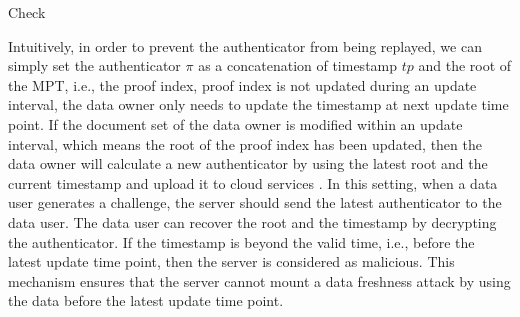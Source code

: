 \begin{algorithm}[t]
  \caption{Check}
  \label{alg:check}
  \begin{algorithmic}[1]
              \ENDIF
                      \BREAK
                    \ENDIF
                \ENDFOR
                \ELSE
                \ENDIF
              \ELSE
              \ENDIF
  \end{algorithmic}
\end{algorithm}

Intuitively, in order to prevent the authenticator from being replayed, we can simply set the authenticator $\pi$ as a concatenation of timestamp $tp$ and the root of the MPT, i.e., the proof index,   proof index is not updated during an update interval, the data owner only needs to update the timestamp at next update time point. If the document set of the data owner is modified within an update interval, which means the root of the proof index has been updated, then the data owner will calculate a new authenticator by using the latest root and the current timestamp and upload it to cloud services . %
In this setting, when a data user generates a challenge, the server should send the latest authenticator to the data user. The data user can recover the root and the timestamp by decrypting the authenticator. If the timestamp is beyond the valid time, i.e., before the latest update time point, then the server is considered as malicious. This mechanism ensures that the server cannot mount a data freshness attack by using the data before the latest update time point.

